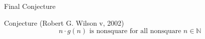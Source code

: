 \documentclass{beamer}
\begin{document}
%
%

\begin{frame}{Final Conjecture}
  \begin{block}{Conjecture (Robert G. Wilson v, 2002)}
    \[n\cdot g(n) \text{ is nonsquare for all nonsquare } n \in \mathbb{N}\]
  \end{block}
\end{frame}
\end{document}
